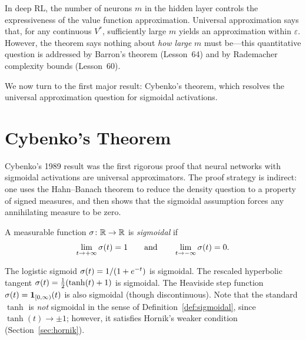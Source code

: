 \documentclass[11pt,a4paper]{article}
\begin{document}
\begin{rlconnection}[title={Network Width and Value Function Quality}]
In deep RL, the number of neurons $m$ in the hidden layer controls the
expressiveness of the value function approximation.  Universal approximation
says that, for any continuous $V^*$, sufficiently large $m$ yields an
approximation within $\varepsilon$.  However, the theorem says nothing
about \emph{how large} $m$ must be---this quantitative question is
addressed by Barron's theorem (Lesson~64) and by Rademacher complexity
bounds (Lesson~60).
\end{rlconnection}

We now turn to the first major result: Cybenko's theorem, which resolves
the universal approximation question for sigmoidal activations.

\section{Cybenko's Theorem}
\label{sec:cybenko}

Cybenko's 1989 result was the first rigorous proof that neural networks
with sigmoidal activations are universal approximators.  The proof
strategy is indirect: one uses the Hahn--Banach theorem to reduce the
density question to a property of signed measures, and then shows that
the sigmoidal assumption forces any annihilating measure to be zero.

\begin{definition}
\label{def:sigmoidal}
A measurable function $\sigma \colon \mathbb{R} \to \mathbb{R}$ is \emph{sigmoidal} if
\[
  \lim_{t \to +\infty} \sigma(t) = 1
  \qquad \text{and} \qquad
  \lim_{t \to -\infty} \sigma(t) = 0.
\]
\end{definition}

\begin{example}
\label{ex:sigmoidal}
The logistic sigmoid $\sigma(t) = 1/(1+e^{-t})$ is sigmoidal.  The
rescaled hyperbolic tangent $\sigma(t) = \frac{1}{2}(\tanh(t) + 1)$ is
sigmoidal.  The Heaviside step function $\sigma(t) = \mathbf{1}_{[0,
\infty)}(t)$ is also sigmoidal (though discontinuous).  Note that the
standard $\tanh$ is \emph{not} sigmoidal in the sense of
Definition~\ref{def:sigmoidal}, since $\tanh(t) \to \pm 1$; however, it
satisfies Hornik's weaker condition (Section~\ref{sec:hornik}).
\end{example}
\end{document}
